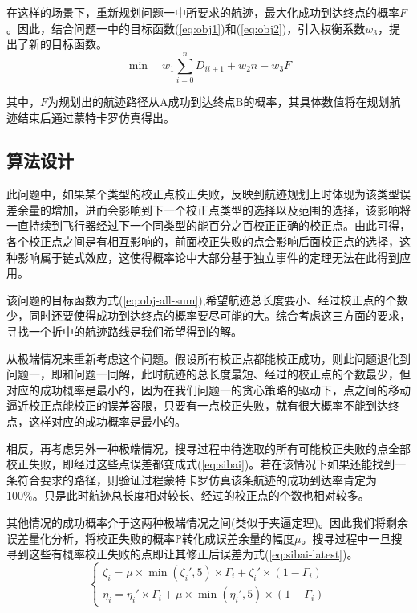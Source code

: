 在这样的场景下，重新规划问题一中所要求的航迹，最大化成功到达终点的概率$F$。因此，结合问题一中的目标函数(\ref{eq:obj1})和(\ref{eq:obj2})，引入权衡系数$w_3$，提出了新的目标函数。
\begin{equation}\label{eq:obj-all-sum}
    \min \quad w_1\sum_{i=0}^n D_{ii+1} + w_2 n - w_3 F
\end{equation}

其中，$F$为规划出的航迹路径从A成功到达终点B的概率，其具体数值将在规划航迹结束后通过蒙特卡罗仿真得出。

\subsection{算法设计}
此问题中，如果某个类型的校正点校正失败，反映到航迹规划上时体现为该类型误差余量的增加，进而会影响到下一个校正点类型的选择以及范围的选择，该影响将一直持续到飞行器经过下一个同类型的能百分之百校正正确的校正点。由此可得，各个校正点之间是有相互影响的，前面校正失败的点会影响后面校正点的选择，这种影响属于链式效应，这使得概率论中大部分基于独立事件的定理无法在此得到应用。

该问题的目标函数为式(\ref{eq:obj-all-sum}),希望航迹总长度要小、经过校正点的个数少，同时还要使得成功到达终点的概率要尽可能的大。综合考虑这三方面的要求，寻找一个折中的航迹路线是我们希望得到的解。

从极端情况来重新考虑这个问题。假设所有校正点都能校正成功，则此问题退化到问题一，即和问题一同解，此时航迹的总长度最短、经过的校正点的个数最少，但对应的成功概率是最小的，因为在我们问题一的贪心策略的驱动下，点之间的移动逼近校正点能校正的误差容限，只要有一点校正失败，就有很大概率不能到达终点，这样对应的成功概率是最小的。

相反，再考虑另外一种极端情况，搜寻过程中待选取的所有可能校正失败的点全部校正失败，即经过这些点误差都变成式(\ref{eq:sibai})。若在该情况下如果还能找到一条符合要求的路径，则验证过程蒙特卡罗仿真该条航迹的成功到达率肯定为100\%。只是此时航迹总长度相对较长、经过的校正点的个数也相对较多。

其他情况的成功概率介于这两种极端情况之间(类似于夹逼定理)。因此我们将剩余误差量化分析，将校正失败的概率$ \mathbb{P} $转化成误差余量的幅度$\mu$。搜寻过程中一旦搜寻到这些有概率校正失败的点即让其修正后误差为式(\ref{eq:sibai-latest})。
\begin{equation}\label{eq:sibai-latest}
    \left\{\begin{matrix}
        \zeta_{i} =\mu \times \min (\zeta_{i}' ,5) \times  \Gamma_{i} + \zeta_{i}'\times  (1-\Gamma_{i}) \\
        \eta_{i} =  \eta_{i}' \times  \Gamma_{i} +  \mu \times \min (\eta_{i}' ,5)\times (1- \Gamma_{i}) 
    \end{matrix}\right. 
\end{equation}

